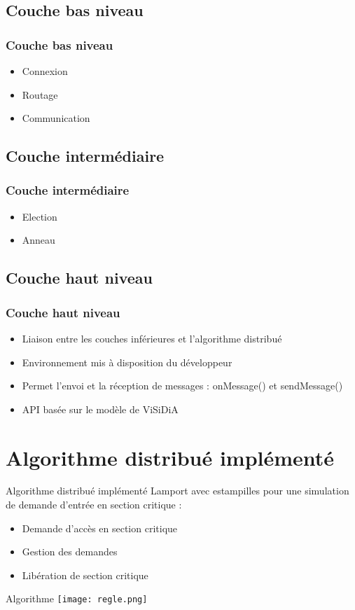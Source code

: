 \documentclass{beamer}
\begin{document}
      \subsection{Couche bas niveau}
          \begin{frame}
    	    \frametitle{Couche bas niveau}
    	    \begin{itemize}
    	        \item Connexion
    	        \item Routage
    	        \item Communication
    	    \end{itemize}
          \end{frame}
      \subsection{Couche intermédiaire}
      \begin{frame}
	  \frametitle{Couche intermédiaire}
	  \begin{itemize}
	      \item Election
	      \item Anneau
	  \end{itemize}
      \end{frame}
      \subsection{Couche haut niveau}
      \begin{frame}
	  \frametitle{Couche haut niveau}
	  \begin{itemize}
	      \item Liaison entre les couches inférieures et l'algorithme distribué
	      \item Environnement mis à disposition du développeur
	      \item Permet l'envoi et la réception de messages : onMessage() et sendMessage()
	      \item API basée sur le modèle de ViSiDiA
	  \end{itemize}
      \end{frame}
    \section{Algorithme distribué implémenté}
    \begin{frame}{Algorithme distribué implémenté}
    Lamport avec estampilles pour une simulation de demande d’entrée en section critique :
        \begin{itemize}
            \item Demande d'accès en section critique
            \item Gestion des demandes
            \item Libération de section critique
        \end{itemize}
    \end{frame}
    \begin{frame}{Algorithme}
        \texttt{[image: regle.png]}
    \end{frame}
\end{document}
